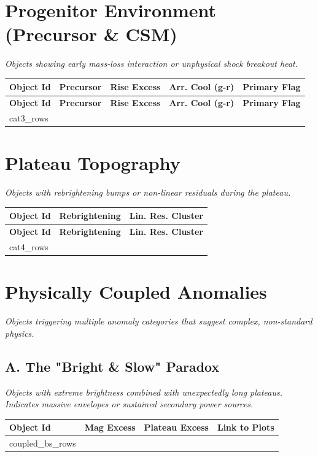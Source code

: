 \documentclass[11pt,a4paper]{article}
\begin{document}
\section{Progenitor Environment (Precursor \& CSM)} \label{sec:catIII}
\textit{Objects showing early mass-loss interaction or unphysical shock breakout heat.}
\begin{longtable}{@{}lcccc@{}}
\toprule
\textbf{Object Id} & \textbf{Precursor} & \textbf{Rise Excess} & \textbf{Arr. Cool (g-r)} & \textbf{Primary Flag} \\ \midrule
\endfirsthead
\toprule
\textbf{Object Id} & \textbf{Precursor} & \textbf{Rise Excess} & \textbf{Arr. Cool (g-r)} & \textbf{Primary Flag} \\ \midrule
\endhead
\bottomrule
\endfoot
{cat3_rows}\end{longtable}

\clearpage
\section{Plateau Topography} \label{sec:catIV}
\textit{Objects with rebrightening bumps or non-linear residuals during the plateau.}
\begin{longtable}{@{}lcc@{}}
\toprule
\textbf{Object Id} & \textbf{Rebrightening} & \textbf{Lin. Res. Cluster} \\ \midrule
\endfirsthead
\toprule
\textbf{Object Id} & \textbf{Rebrightening} & \textbf{Lin. Res. Cluster} \\ \midrule
\endhead
\bottomrule
\endfoot
{cat4_rows}\end{longtable}

\clearpage

\section{Physically Coupled Anomalies}
\textit{Objects triggering multiple anomaly categories that suggest complex, non-standard physics.}

\subsection*{A. The "Bright \& Slow" Paradox}
\textit{Objects with extreme brightness combined with unexpectedly long plateaus. Indicates massive envelopes or sustained secondary power sources.}
\begin{table}[H]
\centering
\begin{tabular}{@{}lccc@{}}
\toprule
\textbf{Object Id} & \textbf{Mag Excess} & \textbf{Plateau Excess} & \textbf{Link to Plots} \\ \midrule
{coupled_bs_rows}\end{tabular}
\end{table}
\end{document}
